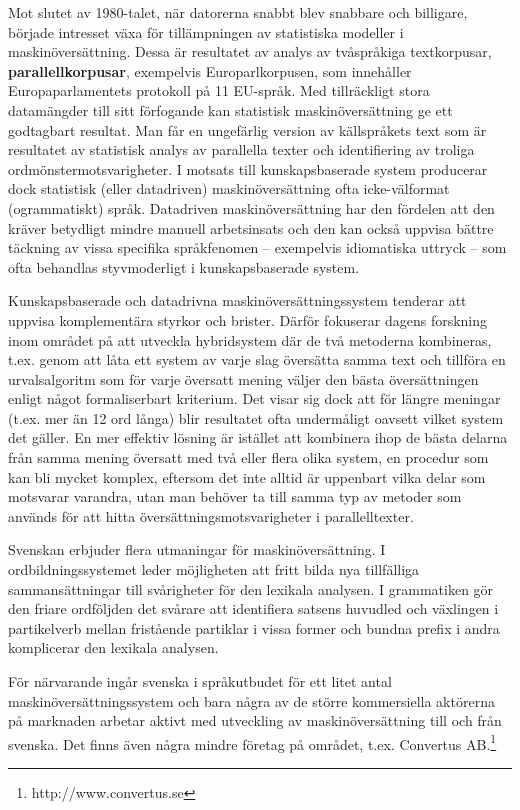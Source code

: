 \begin{multicols}{2}
Mot slutet av 1980-talet, när datorerna snabbt blev snabbare och
billigare, började intresset växa för tillämpningen av statistiska
modeller i maskinöversättning. Dessa är resultatet av analys av
tvåspråkiga textkorpusar, \textbf{parallellkorpusar}, exempelvis
Europarlkorpusen, som innehåller Europaparlamentets protokoll på 11
EU-språk. Med tillräckligt stora data\-mängd\-er till sitt förfogande
kan statistisk maskinöversättning ge ett godtagbart resultat. Man får
en unge\-fär\-lig version av källspråkets text som är resultatet av
statistisk analys av parallella texter och identifiering av troliga
ord\-mönster\-mot\-svarig\-het\-er. I motsats till kunskapsbaserade
system producerar dock statistisk (eller datadriven)
maskinöversättning ofta icke-välformat (ogrammatiskt)
språk. Datadriven maskinöversättning har den fördelen att den kräver
betydligt mindre manuell arbetsinsats och den kan också uppvisa bättre
täckning av vissa specifika språkfenomen -- exempelvis idiomatiska
uttryck -- som ofta behandlas styvmoderligt i kunskapsbaserade system.

Kunskapsbaserade och datadrivna maskinöversättningssystem tenderar att
uppvisa komplementära styrkor och brister. Därför fokuserar dagens
forskning inom området på att utveckla hybridsystem där de två
metoderna kombineras, t.ex. genom att låta ett system av varje slag
översätta samma text och tillföra en ur\-vals\-algo\-ritm som för
varje översatt mening väljer den bästa översättningen enligt något
formaliserbart kriterium. Det visar sig dock att för längre meningar
(t.ex. mer än 12 ord långa) blir resultatet ofta undermåligt oavsett
vilket system det gäller. En mer effektiv lösning är istället att
kombinera ihop de bästa delarna från samma mening översatt med två
eller flera olika system, en procedur som kan bli mycket komplex,
eftersom det inte alltid är uppenbart vilka delar som motsvarar
varandra, utan man behöver ta till samma typ av metoder som används
för att hitta översättningsmotsvarigheter i parallelltexter.

Svenskan erbjuder flera utmaningar för maskinöversättning. I
ordbildningssystemet leder möjligheten att fritt bilda nya tillfälliga
sammansättningar till svårigheter för den lexikala analysen. I
grammatiken gör den friare ordföljden det svårare att identifiera
satsens huvudled och växlingen i partikelverb mellan fristående
partiklar i vissa former och bundna prefix i andra komplicerar den
lexikala analysen.

För närvarande ingår svenska i språkutbudet för ett litet antal
maskinöversättningssystem och bara några av de större kommersiella
aktörerna på marknaden arbetar aktivt med utveckling av
maskinöversättning till och från svenska. Det finns även några mindre
företag på området, t.ex. Convertus
AB.\footnote{http://www.convertus.se}


\end{multicols}
